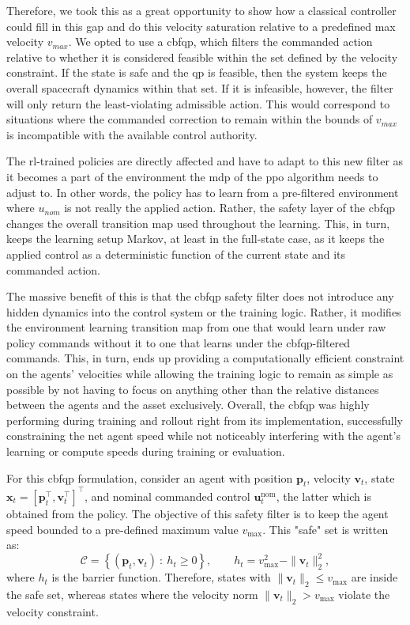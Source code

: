 Therefore, we took this as a great opportunity to show how a classical controller could fill in this gap and do this velocity saturation relative to a predefined max velocity $v_{max}$. We opted to use a \acs{cbfqp}, which filters the commanded action relative to whether it is considered feasible within the set defined by the velocity constraint. If the state is safe and the \acs{qp} is feasible, then the system keeps the overall spacecraft dynamics within that set. If it is infeasible, however, the filter will only return the least-violating admissible action. This would correspond to situations where the commanded correction to remain within the bounds of $v_{max}$ is incompatible with the available control authority.

The \acs{rl}-trained policies are directly affected and have to adapt to this new filter as it becomes a part of the environment the \acs{mdp} of the \acs{ppo} algorithm needs to adjust to. In other words, the policy has to learn from a pre-filtered environment where $u_{nom}$ is not really the applied action. Rather, the safety layer of the \acs{cbfqp} changes the overall transition map used throughout the learning. This, in turn, keeps the learning setup Markov, at least in the full-state case, as it keeps the applied control as a deterministic function of the current state and its commanded action. 

The massive benefit of this is that the \acs{cbfqp} safety filter does not introduce any hidden dynamics into the control system or the training logic. Rather, it modifies the environment learning transition map from one that would learn under raw policy commands without it to one that learns under the \acs{cbfqp}-filtered commands. This, in turn, ends up providing a computationally efficient constraint on the agents' velocities while allowing the training logic to remain as simple as possible by not having to focus on anything other than the relative distances between the agents and the asset exclusively. Overall, the \acs{cbfqp} was highly performing during training and rollout right from its implementation, successfully constraining the net agent speed while not noticeably interfering with the agent's learning or compute speeds during training or evaluation. 

For this \acs{cbfqp} formulation, consider an agent with position $\mathbf{p}_t$, velocity $\mathbf{v}_t$, state $\mathbf{x}_t=[\mathbf{p}_t^\top,\mathbf{v}_t^\top]^\top$, and nominal commanded control $\mathbf{u}^{\mathrm{nom}}_t$, the latter which is obtained from the policy. The objective of this safety filter is to keep the agent speed bounded to a pre-defined maximum value $v_{\max}$. This "safe" set is written as:
\[
\mathcal{C} = \left\{(\mathbf{p}_t,\mathbf{v}_t)\ :\ h_t \ge 0 \right\},
\qquad
h_t = v_{\max}^2 - \|\mathbf{v}_t\|_2^2,
\]
where $h_t$ is the barrier function. Therefore, states with $\|\mathbf{v}_t\|_2 \le v_{\max}$ are inside the safe set, whereas states where the velocity norm $\|\mathbf{v}_t\|_2 > v_{\max}$ violate the velocity constraint.

